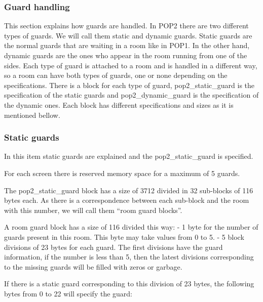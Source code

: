 \documentclass{article}
\begin{document}
\subsubsection{Guard handling} %
 This section explains how guards are handled. In POP2 there are two
 different types of guards. We will call them static and dynamic guards.
 Static guards are the normal guards that are waiting in a room like in
 POP1. In the other hand, dynamic guards are the ones who appear in the
 room running from one of the sides. Each type of guard is attached to a
 room and is handled in a different way, so a room can have both types of
 guards, one or none depending on the specifications. There is a block for
 each type of guard, pop2\_static\_guard is the specification of the static
 guards and pop2\_dynamic\_guard is the specification of the dynamic ones.
 Each block has different specifications and sizes as it is mentioned
 bellow.
 
\subsubsection{Static guards} %
 
 In this item static guards are explained and the pop2\_static\_guard is
 specified.
 
 For each screen there is reserved memory space for a maximum of 5 guards.
 
 The pop2\_static\_guard block has a size of 3712 divided in 32 sub-blocks of
 116 bytes each. As there is a correspondence between each sub-block and
 the room with this number, we will call them ``room guard blocks''.
 
 A room guard block has a size of 116 divided this way:
 - 1 byte for the number of guards present in this room.
   This byte may take values from 0 to 5.
 - 5 block divisions of 23 bytes for each guard.
   The first divisions have the guard information, if the number is less
   than 5, then the latest divisions corresponding to the missing guards
   will be filled with zeros or garbage.
 
 If there is a static guard corresponding to this division of 23 bytes,
 the following bytes from 0 to 22 will specify the guard:
 
\end{document}
